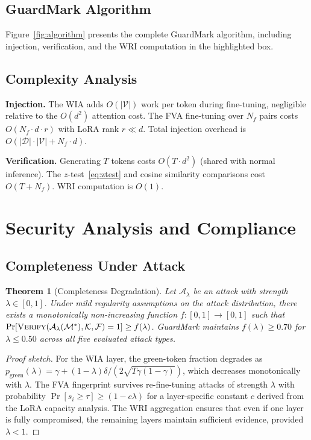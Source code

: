 \documentclass[journal,compsoc]{IEEEtran}
\newtheorem{theorem}{Theorem}
\newcommand{\M}{\mathcal{M}}
\newcommand{\K}{\mathcal{K}}
\newcommand{\F}{\mathcal{F}}
\begin{document}
\subsection{GuardMark Algorithm}

Figure~\ref{fig:algorithm} presents the complete GuardMark algorithm,
including injection, verification, and the WRI computation in the highlighted
box.



\subsection{Complexity Analysis}

\textbf{Injection.} The WIA adds $O(|\mathcal{V}|)$ work per token during fine-tuning,
negligible relative to the $O(d^2)$ attention cost. The FVA fine-tuning over
$N_f$ pairs costs $O(N_f \cdot d \cdot r)$ with LoRA rank $r \ll d$. Total
injection overhead is $O(|\mathcal{D}| \cdot |\mathcal{V}| + N_f \cdot d)$.

\textbf{Verification.} Generating $T$ tokens costs $O(T \cdot d^2)$ (shared
with normal inference). The $z$-test~\eqref{eq:ztest} and cosine similarity
comparisons cost $O(T + N_f)$. WRI computation is $O(1)$.

\section{Security Analysis and Compliance}
\label{sec:security}

\subsection{Completeness Under Attack}

\begin{theorem}[Completeness Degradation]
Let $\mathcal{A}_\lambda$ be an attack with strength $\lambda \in [0,1]$.
Under mild regularity assumptions on the attack distribution, there exists a
monotonically non-increasing function $f: [0,1] \to [0,1]$ such that
$\Pr[\textsc{Verify}(\mathcal{A}_\lambda(\M^*), \K, \F) = 1] \geq f(\lambda)$.
GuardMark maintains $f(\lambda) \geq 0.70$ for $\lambda \leq 0.50$ across all
five evaluated attack types.
\end{theorem}
\begin{proof}[Proof sketch]
For the WIA layer, the green-token fraction degrades as
$p_{\text{green}}(\lambda) = \gamma + (1-\lambda)\delta / (2\sqrt{T\gamma(1-\gamma)})$,
which decreases monotonically with $\lambda$. The FVA fingerprint survives
re-fine-tuning attacks of strength $\lambda$ with probability
$\Pr[s_i \geq \tau] \geq (1 - c\lambda)$ for a layer-specific constant $c$
derived from the LoRA capacity analysis. The WRI aggregation ensures that even
if one layer is fully compromised, the remaining layers maintain sufficient
evidence, provided $\lambda < 1$.
\end{proof}
\end{document}
